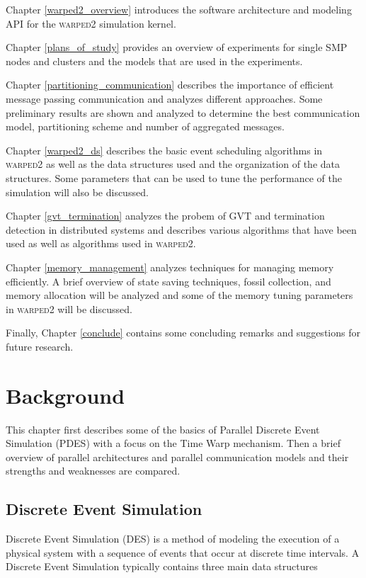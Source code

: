 \documentclass[11pt]{book}
\begin{document}
Chapter \ref{warped2_overview} introduces the software architecture and modeling API for
the \textsc{warped2} simulation kernel.

Chapter \ref{plans_of_study} provides an overview of experiments for single SMP nodes and clusters
and the models that are used in the experiments.

Chapter \ref{partitioning_communication} describes the importance of efficient message passing
communication and analyzes different approaches. Some preliminary results are shown and analyzed
to determine the best communication model, partitioning scheme and number of aggregated
messages.

Chapter \ref{warped2_ds} describes the basic event scheduling algorithms in \textsc{warped2}
as well as the data structures used and the organization of the data structures. Some parameters
that can be used to tune the performance of the simulation will also be discussed.

Chapter \ref{gvt_termination} analyzes the probem of GVT and termination detection in distributed
systems and describes various algorithms that have been used as well as algorithms used in
\textsc{warped2}.

Chapter \ref{memory_management} analyzes techniques for managing memory efficiently. A brief
overview of state saving techniques, fossil collection, and memory allocation will be analyzed
and some of the memory tuning parameters in \textsc{warped2} will be discussed.

Finally, Chapter \ref{conclude} contains some concluding remarks and suggestions for future
research.



\chapter{Background}\label{background}

This chapter first describes some of the basics of Parallel Discrete Event Simulation (PDES)
with a focus on the Time Warp mechanism. Then a brief overview of parallel architectures and
parallel communication models and their strengths and weaknesses are compared.

\section{Discrete Event Simulation}

Discrete Event Simulation (DES) is a method of modeling the execution of a physical system
with a sequence of events that occur at discrete time intervals. A Discrete Event Simulation
typically contains three main data structures
\end{document}
